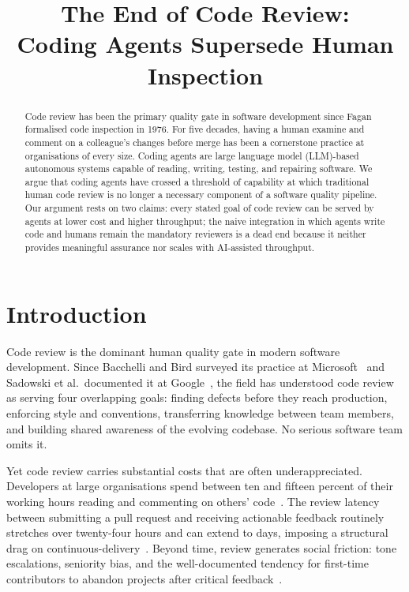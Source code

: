 \documentclass[10pt,conference]{IEEEtran}
\title{The End of Code Review:\\
Coding Agents Supersede Human Inspection}
\author{
  \IEEEauthorblockN{Martin Monperrus}
  \IEEEauthorblockA{KTH Royal Institute of Technology\\
  Stockholm, Sweden\\
  monperrus@kth.se}
}
\begin{document}
\maketitle

\begin{abstract}
Code review has been the primary quality gate in software development since Fagan formalised code inspection in 1976.
For five decades, having a human examine and comment on a colleague's changes before merge has been a cornerstone practice at organisations of every size.
Coding agents are large language model (LLM)-based autonomous systems capable of reading, writing, testing, and repairing software.
We argue that coding agents have crossed a threshold of capability at which traditional human code review is no longer a necessary component of a software quality pipeline.
Our argument rests on two claims: every stated goal of code review can be served by agents at lower cost and higher throughput; the naive integration in which agents write code and humans remain the mandatory reviewers is a dead end because it neither provides meaningful assurance nor scales with AI-assisted throughput.
\end{abstract}

\section{Introduction}
\label{sec:intro}

Code review is the dominant human quality gate in modern software development.
Since Bacchelli and Bird surveyed its practice at Microsoft~\cite{bacchelli2013expectations} and Sadowski et al.\ documented it at Google~\cite{sadowski2018modern}, the field has understood code review as serving four overlapping goals: finding defects before they reach production, enforcing style and conventions, transferring knowledge between team members, and building shared awareness of the evolving codebase.
No serious software team omits it.

Yet code review carries substantial costs that are often underappreciated.
Developers at large organisations spend between ten and fifteen percent of their working hours reading and commenting on others' code~\cite{sadowski2018modern}.
The review latency between submitting a pull request and receiving actionable feedback routinely stretches over twenty-four hours and can extend to days, imposing a structural drag on continuous-delivery~\cite{hilton2016usage}.
Beyond time, review generates social friction: tone escalations, seniority bias, and the well-documented tendency for first-time contributors to abandon projects after critical feedback~\cite{bosu2016process,murgia2014developers}.
\end{document}
